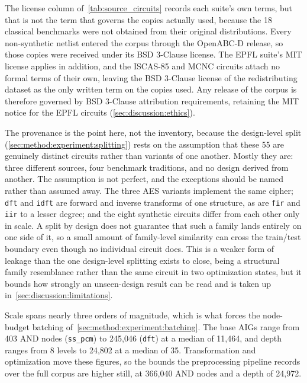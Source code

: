 The license column of~\ref{tab:source_circuits} records each suite's own terms, but that
is not the term that governs the copies actually used, because the 18 classical benchmarks
were not obtained from their original distributions. Every non-synthetic netlist entered
the corpus through the OpenABC-D release, so those copies were received under its BSD
3-Clause license. The EPFL suite's MIT license applies in addition, and the ISCAS-85 and
MCNC circuits attach no formal terms of their own, leaving the BSD 3-Clause license of the
redistributing dataset as the only written term on the copies used. Any release of the
corpus is therefore governed by BSD 3-Clause attribution requirements, retaining the MIT
notice for the EPFL circuits (\ref{sec:discussion:ethics}).

The provenance is the point here, not the inventory, because the design-level split
(\ref{sec:method:experiment:splitting}) rests on the assumption that these 55 are genuinely
distinct circuits rather than variants of one another. Mostly they are: three different
sources, four benchmark traditions, and no design derived from another. The assumption is
not perfect, and the exceptions should be named rather than assumed away. The three AES
variants implement the same cipher; \texttt{dft} and \texttt{idft} are forward and inverse
transforms of one structure, as are \texttt{fir} and \texttt{iir} to a lesser degree; and
the eight synthetic circuits differ from each other only in scale. A split by design does
not guarantee that such a family lands entirely on one side of it, so a small amount of
family-level similarity can cross the train/test boundary even though no individual circuit
does. This is a weaker form of leakage than the one design-level splitting exists to close,
being a structural family resemblance rather than the same circuit in two optimization
states, but it bounds how strongly an unseen-design result can be read and is taken up
in~\ref{sec:discussion:limitations}.

Scale spans nearly three orders of magnitude, which is what forces the node-budget batching
of~\ref{sec:method:experiment:batching}. The base AIGs range from 403 AND nodes
(\texttt{ss\_pcm}) to 245{,}046 (\texttt{dft}) at a median of 11{,}464, and depth ranges
from 8 levels to 24{,}802 at a median of 35. Transformation and optimization move these
figures, so the bounds the preprocessing pipeline records over the full corpus are higher
still, at 366{,}040 AND nodes and a depth of 24{,}972.



